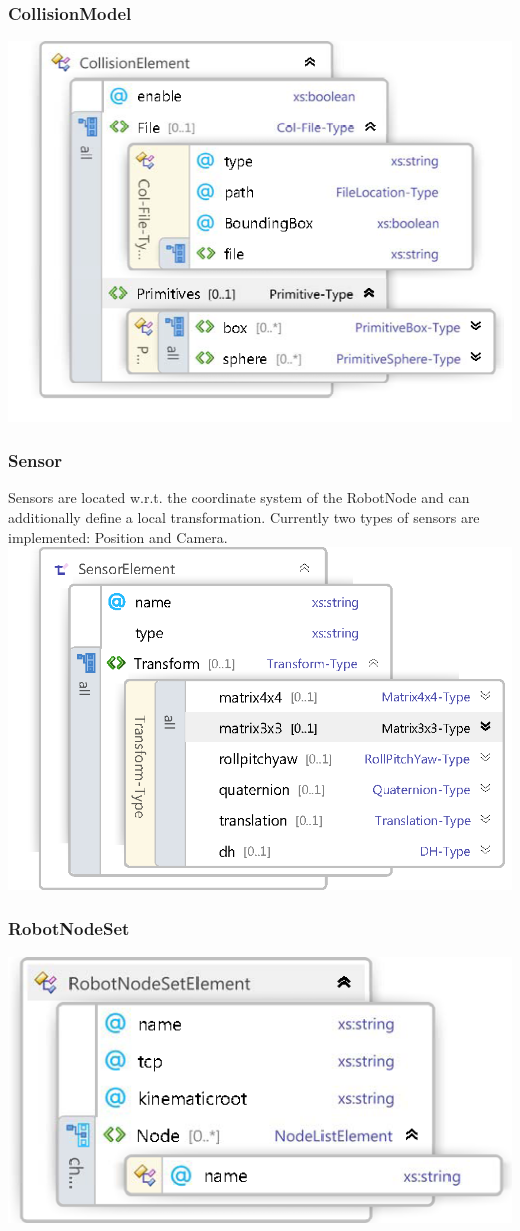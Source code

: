 \subsubsection{CollisionModel}
\includegraphics[width=\textwidth]{Xsd_CollisionModel} 
\subsubsection{Sensor}
Sensors are located w.r.t. the coordinate system of the RobotNode and can additionally define a local transformation. Currently two types of sensors are implemented: Position and Camera. 
\includegraphics[width=\textwidth]{Xsd_Sensor} 
\subsubsection{RobotNodeSet}
\includegraphics[width=\textwidth]{Xsd_RobotNodeSet} 
